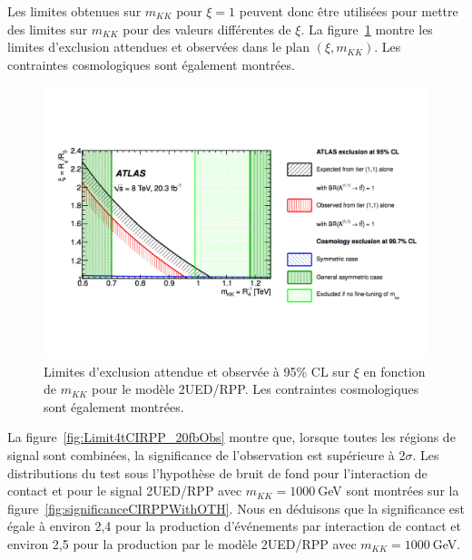 Les limites obtenues sur $m_{KK}$ pour $\xi=1$ peuvent donc \^etre utilis\'ees pour mettre des limites sur $m_{KK}$ pour des valeurs diff\'erentes de $\xi$. La figure~\ref{fig:RPP_observed_2D} montre les limites d'exclusion attendues et observ\'ees dans le plan $\left(\xi,m_{KK}\right)$. Les contraintes cosmologiques sont \'egalement montr\'ees. 

\begin{figure}[!htb]
\begin{center}
\vspace*{-1cm}
\includegraphics[scale=0.5]{figures/paperSameSign/RPP_observed_2D_snapshotfrompaper.pdf}
\end{center}
\vspace*{-2.5cm}
\caption{Limites d'exclusion attendue et observ\'ee \`a 95\% CL sur $\xi$ en fonction de $m_{KK}$ pour le mod\`ele 2UED/RPP. Les contraintes cosmologiques sont \'egalement montr\'ees.}
\label{fig:RPP_observed_2D}
\end{figure}

La figure~\ref{fig:Limit4tCIRPP_20fbObs} montre que, lorsque toutes les r\'egions de signal sont combin\'ees, la significance de l'observation est sup\'erieure \`a 2$\sigma$. 
Les distributions du test sous l'hypoth\`ese de bruit de fond pour l'interaction de contact et pour le signal 2UED/RPP avec $m_{KK}=1000~$GeV sont montr\'ees sur la figure~\ref{fig:significanceCIRPPWithOTH}. 
Nous en d\'eduisons que la significance est \'egale \`a environ 2,4 pour la production d'\'ev\'enements \fourtop{} par interaction de contact et environ 2,5 pour la production par le mod\`ele 2UED/RPP avec $m_{KK}=1000~$GeV.

